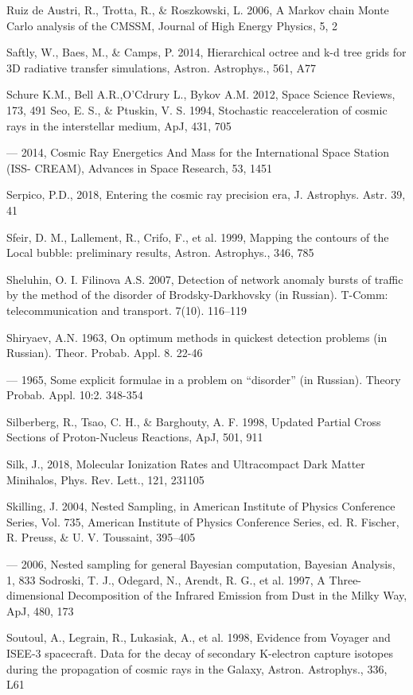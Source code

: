 Ruiz de Austri, R., Trotta, R., \& Roszkowski, L. 2006, A Markov chain Monte Carlo analysis of the CMSSM, Journal of High Energy Physics, 5, 2

Saftly, W., Baes, M., \& Camps, P. 2014, Hierarchical octree and k-d tree grids for 3D radiative transfer simulations, Astron. Astrophys., 561, A77

Schure K.M., Bell A.R.,O'Cdrury L., Bykov A.M. 2012, Space Science Reviews, 173, 491 Seo, E. S., \& Ptuskin, V. S. 1994, Stochastic reacceleration of cosmic rays in the interstellar medium, ApJ, 431, 705

---  2014, Cosmic Ray Energetics And Mass for the International Space Station (ISS- CREAM), Advances in Space Research, 53, 1451

Serpico, P.D., 2018, Entering the cosmic ray precision era, J. Astrophys. Astr. 39, 41

Sfeir, D. M., Lallement, R., Crifo, F., et al. 1999, Mapping the contours of the Local bubble: preliminary results, Astron. Astrophys., 346, 785

Sheluhin, O. I. Filinova A.S. 2007, Detection of network anomaly bursts of traffic by the method of the disorder of Brodsky-Darkhovsky (in Russian). T-Comm: telecommunication and transport. 7(10). 116--119

Shiryaev, A.N. 1963, On optimum methods in quickest detection problems (in Russian). Theor. Probab. Appl. 8. 22-46

--- 1965, Some explicit formulae in a problem on ``disorder'' (in Russian). Theory Probab. Appl. 10:2. 348-354

Silberberg, R., Tsao, C. H., \& Barghouty, A. F. 1998, Updated Partial Cross Sections of Proton-Nucleus Reactions, ApJ, 501, 911

Silk, J., 2018, Molecular Ionization Rates and Ultracompact Dark Matter Minihalos, Phys. Rev. Lett., 121, 231105

Skilling, J. 2004, Nested Sampling, in American Institute of Physics Conference Series, Vol. 735, American Institute of Physics Conference Series, ed. R. Fischer, R. Preuss, \& U. V. Toussaint, 395--405

--- 2006, Nested sampling for general Bayesian computation, Bayesian Analysis, 1, 833 Sodroski, T. J., Odegard, N., Arendt, R. G., et al. 1997, A Three-dimensional Decomposition of the Infrared Emission from Dust in the Milky Way, ApJ, 480, 173

Soutoul, A., Legrain, R., Lukasiak, A., et al. 1998, Evidence from Voyager and ISEE-3 spacecraft. Data for the decay of secondary K-electron capture isotopes during the propagation of cosmic rays in the Galaxy, Astron. Astrophys., 336, L61

